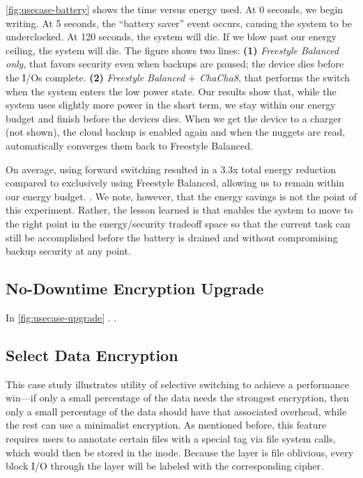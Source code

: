 \cref{fig:usecase-battery} shows the time versus energy used. At 0 seconds, we
begin writing. At 5 seconds, the ``battery saver'' event occurs, causing the
system to be underclocked. At 120 seconds, the system will die. If we blow past
our energy ceiling, the system will die. The figure shows two lines:
%
{\bf (1)} {\em Freestyle Balanced only}, that favors security even when backups
are paused; the device dies before the I/Os complete.
%
{\bf (2)} {\em Freestyle Balanced $+$ ChaCha8}, that performs the switch when
the system enters the low power state. Our results show that, while the system
uses slightly more power in the short term, we stay within our energy budget and
finish before the devices dies.
%
When we get the device to a charger (not shown), the cloud backup is enabled
again and when the nuggets are read, \sys automatically converges them back to
Freestyle Balanced.

On average, using forward switching resulted in a 3.3x total energy reduction
compared to exclusively using Freestyle Balanced, allowing us to remain within
our energy budget. . We note, however, that the energy savings is not
the point of this experiment. Rather, the lesson learned is that \sys enables
the system to move to the right point in the energy/security tradeoff space so
that the current task can still be accomplished before the battery is drained
and without compromising backup security at any point.


\subsection{No-Downtime Encryption Upgrade}\label{subsec:usecase-upgrade}



In \cref{fig:usecase-upgrade} . .


\subsection{Select Data Encryption}\label{subsec:usecase-agnostic}

This case study illustrates utility of selective switching to achieve a
performance win---if only a small percentage of the data needs the strongest
encryption, then only a small percentage of the data should have that associated
overhead, while the rest can use a minimalist encryption. As mentioned before,
this feature requires users to annotate certain files with a special tag via
file system calls, which would then be stored in the inode. Because the \sys
layer is file oblivious, every block I/O through the \sys layer will be labeled
with the corresponding cipher.

